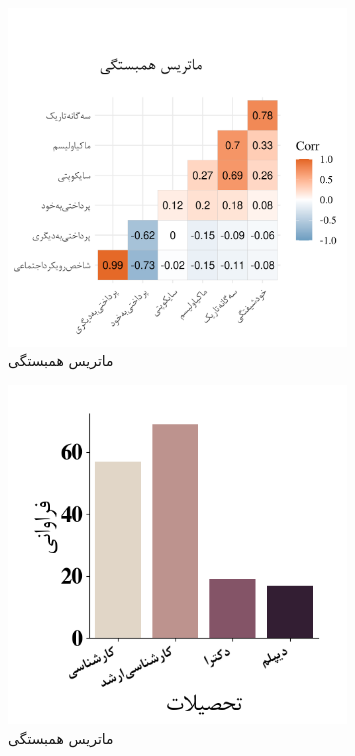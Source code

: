 \LatexFromStatisticsRankMeansCommand
% 
\begin{figure}[htpb]
    \centering
    \includegraphics[width=0.8\textwidth]{./img/CorrPlotIntervals.png}
    \caption{ماتریس همبستگی}
    \label{fig:CorrPlotIntervals}
\end{figure}
\begin{figure}[htpb]
    \centering
    \includegraphics[width=0.8\textwidth]{./img/ordinal/EducationQuestion.png}
    \caption{ماتریس همبستگی}
    \label{fig:CorrPlotIntervals}
\end{figure}
